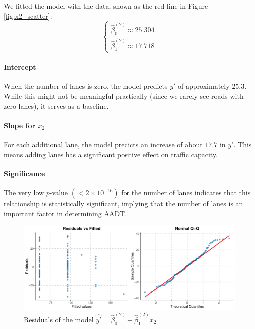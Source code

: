 We fitted the model with the data, shown as the red line in Figure \ref{fig:x2_scatter}:
\begin{equation}
\begin{cases}
    \hat{\beta}_0^{(2)}\approx 25.304\\
    \hat{\beta}_1^{(2)}\approx 17.718
\end{cases}
\end{equation}

\paragraph{Intercept} When the number of lanes is zero, the model predicts $y'$ of approximately $25.3$. While this might not be meaningful practically (since we rarely see roads with zero lanes), it serves as a baseline.

\paragraph{Slope for \(x_2\)} For each additional lane, the model predicts an increase of about $17.7$ in $y'$. This means adding lanes has a significant positive effect on traffic capacity.

\paragraph{Significance} The very low $p$-value $\left(< 2\times 10^{-16}\right)$ for the number of lanes indicates that this relationship is statistically significant, implying that the number of lanes is an important factor in determining AADT.

\begin{figure}
    \centering
    \includegraphics[width=1\linewidth]{figures/x2/residuals_vs_fitted_qqplot}
    \caption{Residuals of the model $\hat{y'} = \hat{\beta}_0^{(2)} +\hat{\beta}_1^{(2)} x_2$}
    \label{fig:x2_res}
\end{figure}


